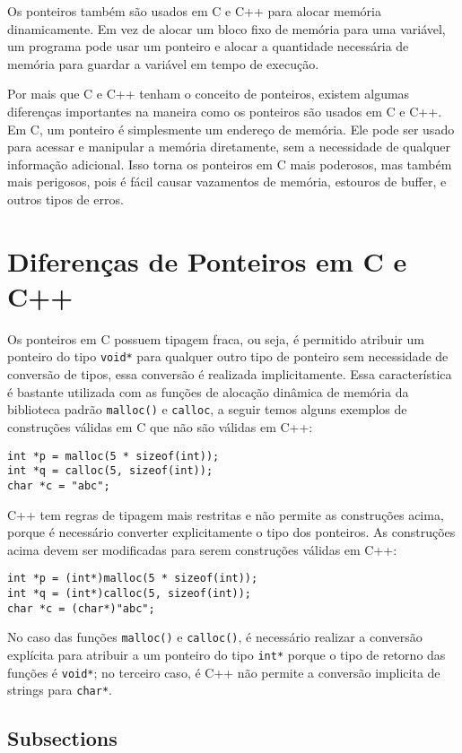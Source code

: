 \documentclass[12pt]{article}
\begin{document}
Os ponteiros também são usados em C e C++ para alocar memória dinamicamente. Em vez de alocar um bloco fixo de memória para uma variável, um programa pode usar um ponteiro e alocar a quantidade necessária de memória para guardar a variável em tempo de execução.

Por mais que C e C++ tenham o conceito de ponteiros, existem algumas diferenças importantes na maneira como os ponteiros são usados em C e C++. Em C, um ponteiro é simplesmente um endereço de memória. Ele pode ser usado para acessar e manipular a memória diretamente, sem a necessidade de qualquer informação adicional. Isso torna os ponteiros em C mais poderosos, mas também mais perigosos, pois é fácil causar vazamentos de memória, estouros de buffer, e outros tipos de erros.

\section{Diferenças de Ponteiros em C e C++}

Os ponteiros em C possuem tipagem fraca, ou seja, é permitido atribuir um ponteiro do tipo \texttt{void*} para qualquer outro tipo de ponteiro sem necessidade de conversão de tipos, essa conversão é realizada implicitamente. Essa característica é bastante utilizada com as funções de alocação dinâmica de memória da biblioteca padrão \texttt{malloc()} e \texttt{calloc}, a seguir temos alguns exemplos de construções válidas em C que não são válidas em C++:
\begin{verbatim}
int *p = malloc(5 * sizeof(int));
int *q = calloc(5, sizeof(int));
char *c = "abc";
\end{verbatim}

C++ tem regras de tipagem mais restritas e não permite as construções acima, porque é necessário converter explicitamente o tipo dos ponteiros. As construções acima devem ser modificadas para serem construções válidas em C++:
\begin{verbatim}
int *p = (int*)malloc(5 * sizeof(int));
int *q = (int*)calloc(5, sizeof(int));
char *c = (char*)"abc";
\end{verbatim}

No caso das funções \texttt{malloc()} e \texttt{calloc()}, é necessário realizar a conversão explícita para atribuir a um ponteiro do tipo \texttt{int*} porque o tipo de retorno das funções é \texttt{void*}; no terceiro caso, é  C++ não permite a conversão implicita de strings para \texttt{char*}.

\subsection{Subsections}
\end{document}
